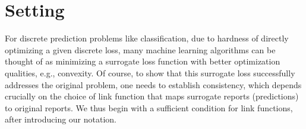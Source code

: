 \documentclass[12pt]{article}
\newcommand{\Comments}{1}
\newcommand{\mynote}[2]{\ifnum\Comments=1\textcolor{#1}{#2}\fi}
\newcommand{\raf}[1]{\mynote{green}{[RF: #1]}}
\newcommand{\reals}{\mathbb{R}}
\newcommand{\prop}[1]{\Gamma[#1]}
\newcommand{\eliccvx}{\mathrm{elic}_\mathrm{cvx}}
\newcommand{\elicpoly}{\mathrm{elic}_\mathrm{pcvx}}
\newcommand{\elicembed}{\mathrm{elic}_\mathrm{embed}}
\newcommand{\simplex}{\Delta_\Y}
\newcommand{\R}{\mathcal{R}}
\newcommand{\Y}{\mathcal{Y}}
\newcommand{\toto}{\rightrightarrows}
\newcommand{\strip}{\mathrm{strip}}
\newcommand{\trim}{\mathrm{trim}}
\begin{document}

  

\section{Setting}
\label{sec:setting}

For discrete prediction problems like classification, due to hardness of directly optimizing a given discrete loss, many machine learning algorithms can be thought of as minimizing a surrogate loss function with better optimization qualities, e.g., convexity.
Of course, to show that this surrogate loss successfully addresses the original problem, one needs to establish consistency, which depends crucially on the choice of link function that maps surrogate reports (predictions) to original reports.
We thus begin with a sufficient condition for link functions, after introducing our notation.
\end{document}
